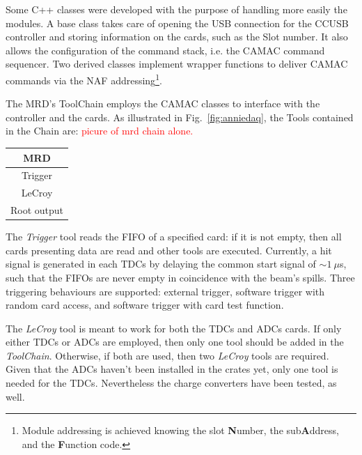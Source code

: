Some C++ classes were developed with the purpose of handling more easily the modules.
A base class takes care of opening the USB connection for the CCUSB controller and storing %
information on the cards, such as the Slot number.
It also allows the configuration of the command stack, i.e. the CAMAC command sequencer.
Two derived classes implement wrapper functions to deliver CAMAC commands via the %
NAF addressing\footnote{Module addressing is achieved knowing the slot \textbf{N}umber, %
the sub\textbf{A}ddress, and the \textbf{F}unction code.}.

The MRD's ToolChain employs the CAMAC classes to interface with the controller and the cards.
As illustrated in Fig.~\ref{fig:anniedaq}, the Tools contained in the Chain are:
\textcolor{red}{picure of mrd chain alone.}

\begin{center}
  \small
  \begin{tabular}{c}
    \toprule
    \textbf{MRD}	\\
    \midrule
    Trigger	\\
    LeCroy 	\\
    Root output	\\
    \bottomrule
  \end{tabular}
\end{center}

The \emph{Trigger} tool reads the FIFO of a specified card: if it is not empty, then all %
cards presenting data are read and other tools are executed.
Currently, a hit signal is generated in each TDCs by delaying the common start %
signal of $\sim 1~\mu$s, such that the FIFOs are never empty in coincidence with the beam's spills.
Three triggering behaviours are supported: external trigger, software trigger with %
random card access, and software trigger with card test function.

The \emph{LeCroy} tool is meant to work for both the TDCs and ADCs cards.
If only either TDCs or ADCs are employed, then only one tool should be added in the \emph{ToolChain}.
Otherwise, if both are used, then two \emph{LeCroy} tools are required.
Given that the ADCs haven't been installed in the crates yet, only one tool is %
needed for the TDCs.
Nevertheless the charge converters have been tested, as well.

